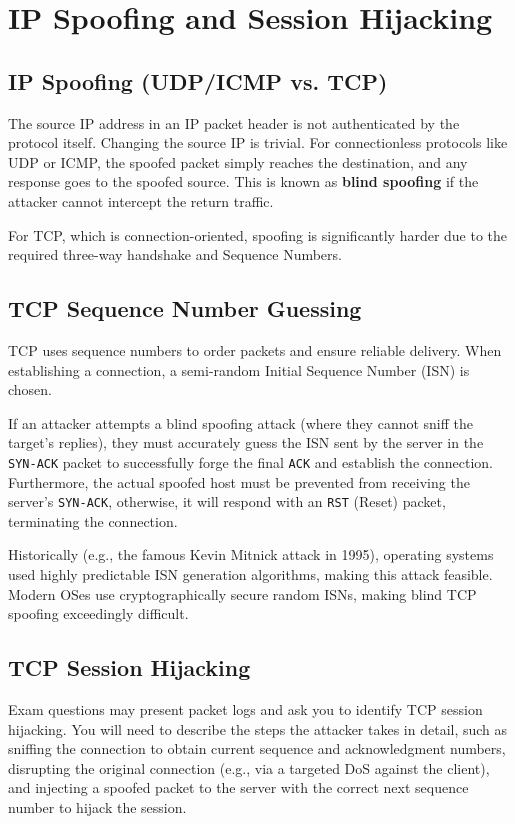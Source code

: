 \section{IP Spoofing and Session Hijacking}

\subsection{IP Spoofing (UDP/ICMP vs. TCP)}
The source IP address in an IP packet header is not authenticated by the protocol itself. Changing the source IP is trivial. For connectionless protocols like UDP or ICMP, the spoofed packet simply reaches the destination, and any response goes to the spoofed source. This is known as \textbf{blind spoofing} if the attacker cannot intercept the return traffic.

For TCP, which is connection-oriented, spoofing is significantly harder due to the required three-way handshake and Sequence Numbers.

\subsection{TCP Sequence Number Guessing}
TCP uses sequence numbers to order packets and ensure reliable delivery. When establishing a connection, a semi-random Initial Sequence Number (ISN) is chosen. 

If an attacker attempts a blind spoofing attack (where they cannot sniff the target's replies), they must accurately guess the ISN sent by the server in the \texttt{SYN-ACK} packet to successfully forge the final \texttt{ACK} and establish the connection. Furthermore, the actual spoofed host must be prevented from receiving the server's \texttt{SYN-ACK}, otherwise, it will respond with an \texttt{RST} (Reset) packet, terminating the connection.

Historically (e.g., the famous Kevin Mitnick attack in 1995), operating systems used highly predictable ISN generation algorithms, making this attack feasible. Modern OSes use cryptographically secure random ISNs, making blind TCP spoofing exceedingly difficult.

\subsection{TCP Session Hijacking}

\begin{tcolorbox}[colback=blue!5!white,colframe=blue!75!black,title=Exam Insight]
Exam questions may present packet logs and ask you to identify TCP session hijacking. You will need to describe the steps the attacker takes in detail, such as sniffing the connection to obtain current sequence and acknowledgment numbers, disrupting the original connection (e.g., via a targeted DoS against the client), and injecting a spoofed packet to the server with the correct next sequence number to hijack the session.
\end{tcolorbox}


